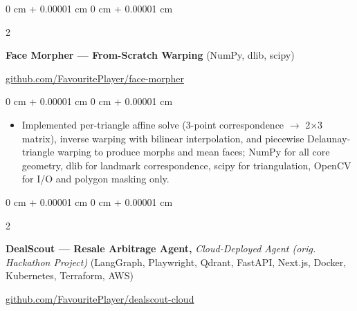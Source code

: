 \documentclass[10pt, letterpaper]{article}
\newenvironment{highlights}{
    \begin{itemize}[
        topsep=0.3 cm,
        parsep=0.05 cm,
        partopsep=0pt,
        itemsep=0.02 cm,
        leftmargin=0 cm + 10pt
    ]
}{
    \end{itemize}
} %
\newenvironment{onecolentry}{
    \begin{adjustwidth}{
        0 cm + 0.00001 cm
    }{
        0 cm + 0.00001 cm
    }
}{
    \end{adjustwidth}
} %
\newenvironment{extendedtwocolentry}[2][]{
    \onecolentry
    \def\secondColumn{#2}
    \setcolumnwidth{\fill, 8 cm}
    \begin{paracol}{2}
}{
    \switchcolumn \raggedleft \secondColumn
    \end{paracol}
    \endonecolentry
}
\begin{document}
        \begin{extendedtwocolentry}{
            \href{https://github.com/FavouritePlayer/face-morpher}{github.com/FavouritePlayer/face-morpher}
        }
            \textbf{Face Morpher — From-Scratch Warping} (NumPy, dlib, scipy)
        \end{extendedtwocolentry}

        \vspace{0.10 cm}
        \begin{onecolentry}
            \begin{highlights}
                \item Implemented per-triangle affine solve (3-point correspondence $\rightarrow$ 2$\times$3 matrix), inverse warping with bilinear interpolation, and piecewise Delaunay-triangle warping to produce morphs and mean faces; NumPy for all core geometry, dlib for landmark correspondence, scipy for triangulation, OpenCV for I/O and polygon masking only.
            \end{highlights}
        \end{onecolentry}

        \begin{extendedtwocolentry}{
            \href{https://github.com/FavouritePlayer/dealscout-cloud}{github.com/FavouritePlayer/dealscout-cloud}
        }
            \textbf{DealScout — Resale Arbitrage Agent,} \textit{Cloud-Deployed Agent (orig. Hackathon Project)} (LangGraph, Playwright, Qdrant, FastAPI, Next.js, Docker, Kubernetes, Terraform, AWS)
        \end{extendedtwocolentry}
\end{document}

